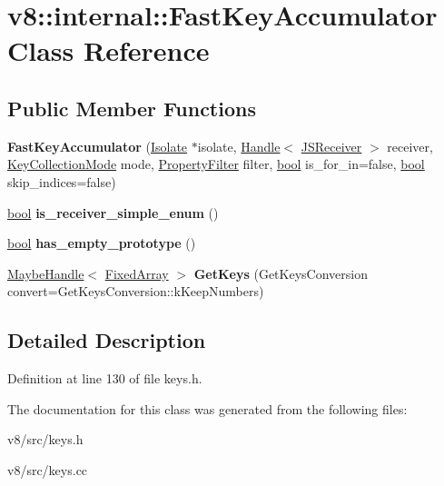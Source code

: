 \hypertarget{classv8_1_1internal_1_1FastKeyAccumulator}{}\section{v8\+:\+:internal\+:\+:Fast\+Key\+Accumulator Class Reference}
\label{classv8_1_1internal_1_1FastKeyAccumulator}
\subsection*{Public Member Functions}
\begin{DoxyCompactItemize}
\item 
\mbox{\label{classv8_1_1internal_1_1FastKeyAccumulator_a02dcab2a161d7a059c479770270f5a06}} 
{\bfseries Fast\+Key\+Accumulator} (\mbox{\hyperlink{classv8_1_1internal_1_1Isolate}{Isolate}} $\ast$isolate, \mbox{\hyperlink{classv8_1_1internal_1_1Handle}{Handle}}$<$ \mbox{\hyperlink{classv8_1_1internal_1_1JSReceiver}{J\+S\+Receiver}} $>$ receiver, \mbox{\hyperlink{namespacev8_a0cee20f5c7f0d59d0835af8e537388dc}{Key\+Collection\+Mode}} mode, \mbox{\hyperlink{namespacev8_afbf02b6b1152a3e25d7bde90798209ac}{Property\+Filter}} filter, \mbox{\hyperlink{classbool}{bool}} is\+\_\+for\+\_\+in=false, \mbox{\hyperlink{classbool}{bool}} skip\+\_\+indices=false)
\item 
\mbox{\label{classv8_1_1internal_1_1FastKeyAccumulator_ad3fa0ed0efd7162b94f434f78fbd0f53}} 
\mbox{\hyperlink{classbool}{bool}} {\bfseries is\+\_\+receiver\+\_\+simple\+\_\+enum} ()
\item 
\mbox{\label{classv8_1_1internal_1_1FastKeyAccumulator_a42ae93ef9c49f72046d4a82139f44ee5}} 
\mbox{\hyperlink{classbool}{bool}} {\bfseries has\+\_\+empty\+\_\+prototype} ()
\item 
\mbox{\label{classv8_1_1internal_1_1FastKeyAccumulator_a4078bcdd21e2265f53f946a6d454eed0}} 
\mbox{\hyperlink{classv8_1_1internal_1_1MaybeHandle}{Maybe\+Handle}}$<$ \mbox{\hyperlink{classv8_1_1internal_1_1FixedArray}{Fixed\+Array}} $>$ {\bfseries Get\+Keys} (Get\+Keys\+Conversion convert=Get\+Keys\+Conversion\+::k\+Keep\+Numbers)
\end{DoxyCompactItemize}


\subsection{Detailed Description}


Definition at line 130 of file keys.\+h.



The documentation for this class was generated from the following files\+:\begin{DoxyCompactItemize}
\item 
v8/src/keys.\+h\item 
v8/src/keys.\+cc\end{DoxyCompactItemize}
